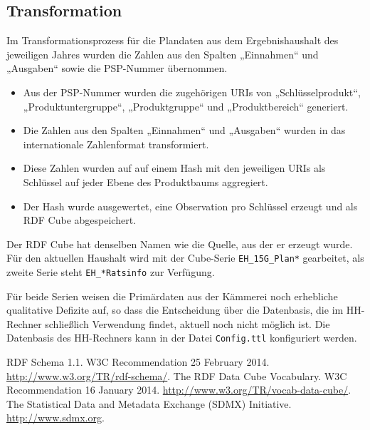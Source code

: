 \documentclass[a4paper,11pt,twoside]{article}
\begin{document}
\subsection{Transformation}

Im Transformationsprozess für die Plandaten aus dem Ergebnishaushalt des
jeweiligen Jahres wurden die Zahlen aus den Spalten „Einnahmen“ und „Ausgaben“
sowie die PSP-Nummer übernommen. 
\begin{itemize}
\item Aus der PSP-Nummer wurden die zugehörigen URIs von „Schlüsselprodukt“,
  „Produktuntergruppe“, „Produktgruppe“ und „Produktbereich“ generiert.
\item Die Zahlen aus den Spalten „Einnahmen“ und „Ausgaben“ wurden in das
  internationale Zahlenformat transformiert.
\item Diese Zahlen wurden auf auf einem Hash mit den jeweiligen URIs als
  Schlüssel auf jeder Ebene des Produktbaums aggregiert.
\item Der Hash wurde ausgewertet, eine Observation pro Schlüssel erzeugt und
  als RDF Cube abgespeichert.
\end{itemize}
Der RDF Cube hat denselben Namen wie die Quelle, aus der er erzeugt wurde.  Für
den aktuellen Haushalt wird mit der Cube-Serie \texttt{EH\_15G\_Plan*}
gearbeitet, als zweite Serie steht \texttt{EH\_*Ratsinfo} zur Verfügung.

Für beide Serien weisen die Primärdaten aus der Kämmerei noch erhebliche
qualitative Defizite auf, so dass die Entscheidung über die Datenbasis, die im
HH-Rechner schließlich Verwendung findet, aktuell noch nicht möglich ist.  Die
Datenbasis des HH-Rechners kann in der Datei \texttt{Config.ttl} konfiguriert
werden.


\begin{thebibliography}{xxx}
 RDF Schema 1.1.  W3C Recommendation 25 February 2014.
  \url{http://www.w3.org/TR/rdf-schema/}.
 The RDF Data Cube Vocabulary.  W3C Recommendation 16 January
  2014.  \url{http://www.w3.org/TR/vocab-data-cube/}.
 The Statistical Data and Metadata Exchange (SDMX) Initiative.
  \url{http://www.sdmx.org}.
\end{thebibliography}
\end{document}
